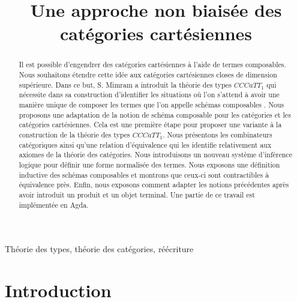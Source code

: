 \documentclass[conference]{IEEEtran}
\begin{document}
	
	\title{Une approche non biaisée des catégories cartésiennes}
	
	\author{
	}
	\maketitle
	
	\begin{abstract} Il est possible d'engendrer des catégories cartésiennes à l'aide de termes composables. Nous souhaitons étendre cette idée aux catégories cartésiennes closes de dimension supérieure. Dans ce but, S. Mimram a introduit la théorie des types $CCCaTT_1$ qui nécessite dans sa construction d'identifier les situations où l'on s'attend à avoir une manière unique de composer les termes que l'on appelle \guillemotleft schémas composables \guillemotright. Nous proposons une adaptation de la notion de schéma composable pour les catégories et les catégories cartésiennes. Cela est une première étape pour proposer une variante à la construction de la théorie des types $CCCaTT_1$. Nous présentons les combinateurs catégoriques ainsi qu'une relation d'équivalence qui les identifie relativement aux axiomes de la théorie des catégories. Nous introduisons un nouveau système d'inférence logique pour définir une forme normalisée des termes. Nous exposons une définition inductive des schémas composables et montrons que ceux-ci sont contractibles à équivalence près. Enfin, nous exposons comment adapter les notions précédentes après avoir introduit un produit et un objet terminal. Une partie de ce travail est implémentée en Agda.
	\end{abstract}
	
	\begin{IEEEkeywords}
		Théorie des types, théorie des catégories, réécriture
	\end{IEEEkeywords}
	
	\section{Introduction} \label{intro}
	
\end{document}
